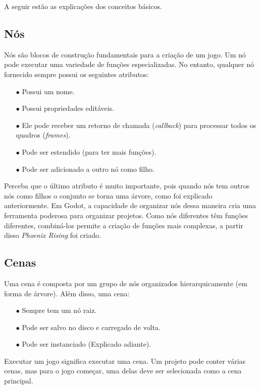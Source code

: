 A seguir estão as explicações dos conceitos básicos.

\subsection{Nós}

Nós são blocos de construção fundamentais para a criação de um jogo. Um nó pode
executar uma variedade de funções especializadas.
No entanto, qualquer nó fornecido sempre possui os seguintes atributos:
\begin{itemize}
    \item[$\bullet$]
        Possui um nome.
    \item[$\bullet$]
        Possui propriedades editáveis.
    \item[$\bullet$]
        Ele pode receber um retorno de chamada (\textit{callback}) para 
        processar todos os quadros (\textit{frames}).
    \item[$\bullet$]
        Pode ser estendido (para ter mais funções).
    \item[$\bullet$]
        Pode ser adicionado a outro nó como filho.
\end{itemize}

Perceba que o último atributo é muito importante, pois quando nós tem outros nós
como filhos o conjunto se torna uma árvore, como foi explicado anteriormente.
Em Godot, a capacidade de organizar nós dessa maneira cria uma ferramenta 
poderosa para organizar projetos. Como nós diferentes têm funções diferentes, 
combiná-los permite a criação de funções mais complexas, a partir disso
\textit{Phoenix Rising} foi criado.

\subsection{Cenas}

Uma cena é composta por um grupo de nós organizados hierarquicamente 
(em forma de árvore). Além disso, uma cena:

\begin{itemize}
    \item[$\bullet$]
        Sempre tem um nó raiz.
    \item[$\bullet$]
        Pode ser salvo no disco e carregado de volta.
    \item[$\bullet$]
        Pode ser instanciado (Explicado adiante).
\end{itemize}

Executar um jogo significa executar uma cena. Um projeto pode conter várias 
cenas, mas para o jogo começar, uma delas deve ser selecionada como a cena 
principal.

